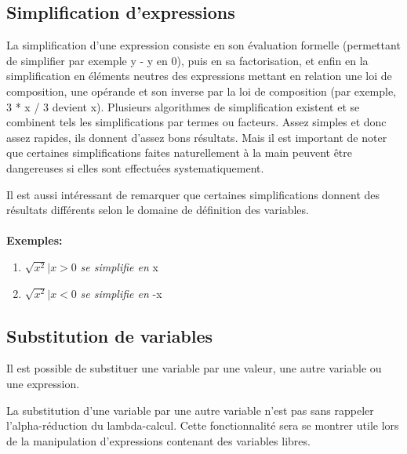 \documentclass[french,12pt]{report}
\begin{document}
\subsection{Simplification d'expressions}

La  simplification  d'une  expression  consiste  en  son  \'evaluation
formelle (permettant de simplifier par exemple y - y en 0), puis en sa
factorisation, et  enfin en la simplification  en \'el\'ements neutres
des  expressions  mettant en  relation  une  loi  de composition,  une
op\'erande et son inverse par la  loi de composition (par exemple, 3 *
x / 3 devient x).  Plusieurs algorithmes de simplification existent et
se combinent  tels les simplifications  par termes ou  facteurs. Assez
simples   et   donc   assez   rapides,  ils   donnent   d'assez   bons
r\'esultats.   Mais  il   est   important  de   noter  que   certaines
simplifications  faites  naturellement  \`a  la  main  peuvent  \^etre
dangereuses si elles sont effectu\'ees systematiquement.

Il est aussi int\'eressant  de remarquer que certaines simplifications
donnent des r\'esultats diff\'erents  selon le domaine de d\'efinition
des variables.

\paragraph{}
{\bf Exemples: }
\begin{enumerate}
\item
  \begin{math}
    \sqrt {x^{2}} | x > 0
  \end{math}
      {\it  se simplifie en } x
\item
  \begin{math}
    \sqrt {x^{2}} | x < 0
  \end{math}
  {\it  se simplifie en } -x
\end{enumerate}


\subsection{Substitution de variables}

Il est possible  de substituer une variable par  une valeur, une autre
variable ou une expression.

La substitution d'une  variable par une autre variable  n'est pas sans
rappeler l'alpha-r\'eduction  du lambda-calcul. Cette fonctionnalit\'e
sera se montrer utile  lors de la manipulation d'expressions contenant
des variables libres.
\end{document}
